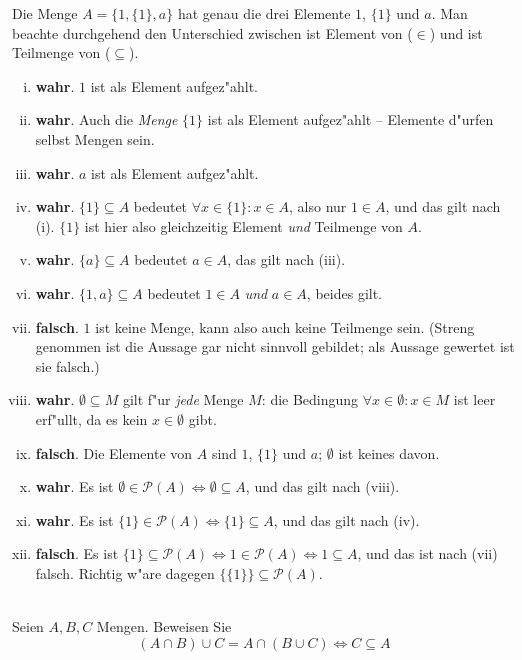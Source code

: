 \begin{loesung}
Die Menge $A=\{1,\{1\},a\}$ hat genau die drei Elemente $1$, $\{1\}$ und $a$. Man beachte durchgehend den Unterschied zwischen \glqq ist Element von\grqq{} ($\in$) und \glqq ist Teilmenge von\grqq{} ($\subseteq$).
\begin{enumerate}[(i)]
  \item \textbf{wahr}. $1$ ist als Element aufgez"ahlt.
  \item \textbf{wahr}. Auch die \emph{Menge} $\{1\}$ ist als Element aufgez"ahlt -- Elemente d"urfen selbst Mengen sein.
  \item \textbf{wahr}. $a$ ist als Element aufgez"ahlt.
  \item \textbf{wahr}. $\{1\}\subseteq A$ bedeutet $\forall x\in\{1\}:x\in A$, also nur $1\in A$, und das gilt nach (i). $\{1\}$ ist hier also gleichzeitig Element \emph{und} Teilmenge von $A$.
  \item \textbf{wahr}. $\{a\}\subseteq A$ bedeutet $a\in A$, das gilt nach (iii).
  \item \textbf{wahr}. $\{1,a\}\subseteq A$ bedeutet $1\in A$ \emph{und} $a\in A$, beides gilt.
  \item \textbf{falsch}. $1$ ist keine Menge, kann also auch keine Teilmenge sein. (Streng genommen ist die Aussage gar nicht sinnvoll gebildet; als Aussage gewertet ist sie falsch.)
  \item \textbf{wahr}. $\emptyset\subseteq M$ gilt f"ur \emph{jede} Menge $M$: die Bedingung $\forall x\in\emptyset:x\in M$ ist leer erf"ullt, da es kein $x\in\emptyset$ gibt.
  \item \textbf{falsch}. Die Elemente von $A$ sind $1$, $\{1\}$ und $a$; $\emptyset$ ist keines davon.
  \item \textbf{wahr}. Es ist $\emptyset\in\mathcal{P}(A)\Leftrightarrow\emptyset\subseteq A$, und das gilt nach (viii).
  \item \textbf{wahr}. Es ist $\{1\}\in\mathcal{P}(A)\Leftrightarrow\{1\}\subseteq A$, und das gilt nach (iv).
  \item \textbf{falsch}. Es ist $\{1\}\subseteq\mathcal{P}(A)\Leftrightarrow 1\in\mathcal{P}(A)\Leftrightarrow 1\subseteq A$, und das ist nach (vii) falsch. Richtig w"are dagegen $\{\{1\}\}\subseteq\mathcal{P}(A)$.
\end{enumerate}
\end{loesung}

\\
Seien $A,B,C$ Mengen. Beweisen Sie \[(A\cap B)\cup C=A\cap (B\cup C)\Leftrightarrow C\subseteq A\]

